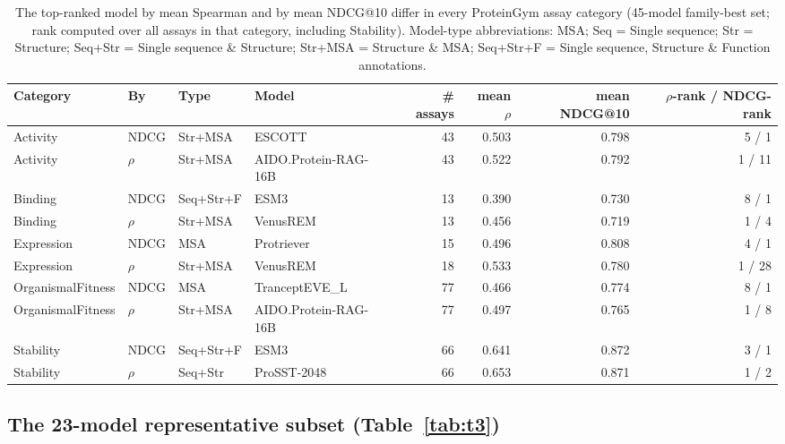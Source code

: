 \documentclass{article}
\begin{document}
\begin{table}[h]
  \caption{The top-ranked model by mean Spearman and by mean NDCG@10 differ in every ProteinGym assay category (45-model family-best set; rank computed over all assays in that category, including Stability). Model-type abbreviations: MSA; Seq = Single sequence; Str = Structure; Seq+Str = Single sequence \& Structure; Str+MSA = Structure \& MSA; Seq+Str+F = Single sequence, Structure \& Function annotations.}
  \label{tab:t2}
  \centering
  \footnotesize
  \begin{tabular}{llllrrrr}
    \toprule
    Category & By & Type & Model & \# assays & mean $\rho$ & mean NDCG@10 & $\rho$-rank / NDCG-rank \\
    \midrule
    Activity & NDCG & Str+MSA & ESCOTT & 43 & 0.503 & 0.798 & 5 / 1 \\
    Activity & $\rho$ & Str+MSA & AIDO.Protein-RAG-16B & 43 & 0.522 & 0.792 & 1 / 11 \\
    Binding & NDCG & Seq+Str+F & ESM3 & 13 & 0.390 & 0.730 & 8 / 1 \\
    Binding & $\rho$ & Str+MSA & VenusREM & 13 & 0.456 & 0.719 & 1 / 4 \\
    Expression & NDCG & MSA & Protriever & 15 & 0.496 & 0.808 & 4 / 1 \\
    Expression & $\rho$ & Str+MSA & VenusREM & 18 & 0.533 & 0.780 & 1 / 28 \\
    OrganismalFitness & NDCG & MSA & TranceptEVE\_L & 77 & 0.466 & 0.774 & 8 / 1 \\
    OrganismalFitness & $\rho$ & Str+MSA & AIDO.Protein-RAG-16B & 77 & 0.497 & 0.765 & 1 / 8 \\
    Stability & NDCG & Seq+Str+F & ESM3 & 66 & 0.641 & 0.872 & 3 / 1 \\
    Stability & $\rho$ & Seq+Str & ProSST-2048 & 66 & 0.653 & 0.871 & 1 / 2 \\
    \bottomrule
  \end{tabular}
\end{table}
\FloatBarrier

\subsection{The 23-model representative subset (Table~\ref{tab:t3})}
\end{document}
